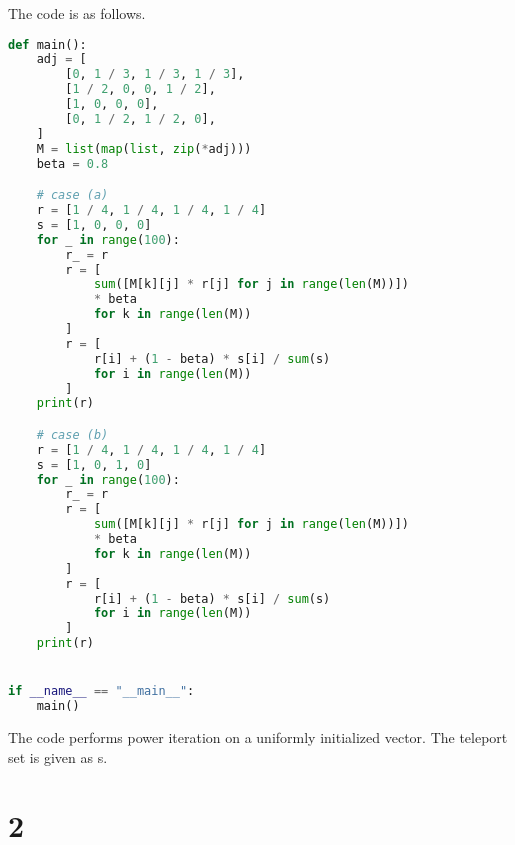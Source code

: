 \documentclass{article}
\begin{document}
\noindent
The code is as follows.
\begin{lstlisting}[language=Python]
def main():
    adj = [
        [0, 1 / 3, 1 / 3, 1 / 3],
        [1 / 2, 0, 0, 1 / 2],
        [1, 0, 0, 0],
        [0, 1 / 2, 1 / 2, 0],
    ]
    M = list(map(list, zip(*adj)))
    beta = 0.8

    # case (a)
    r = [1 / 4, 1 / 4, 1 / 4, 1 / 4]
    s = [1, 0, 0, 0]
    for _ in range(100):
        r_ = r
        r = [
            sum([M[k][j] * r[j] for j in range(len(M))])
            * beta
            for k in range(len(M))
        ]
        r = [
            r[i] + (1 - beta) * s[i] / sum(s)
            for i in range(len(M))
        ]
    print(r)

    # case (b)
    r = [1 / 4, 1 / 4, 1 / 4, 1 / 4]
    s = [1, 0, 1, 0]
    for _ in range(100):
        r_ = r
        r = [
            sum([M[k][j] * r[j] for j in range(len(M))])
            * beta
            for k in range(len(M))
        ]
        r = [
            r[i] + (1 - beta) * s[i] / sum(s)
            for i in range(len(M))
        ]
    print(r)


if __name__ == "__main__":
    main()
\end{lstlisting}

\noindent
The code performs power iteration on a uniformly initialized vector. The teleport set is given as s.

\section*{2}
\end{document}
